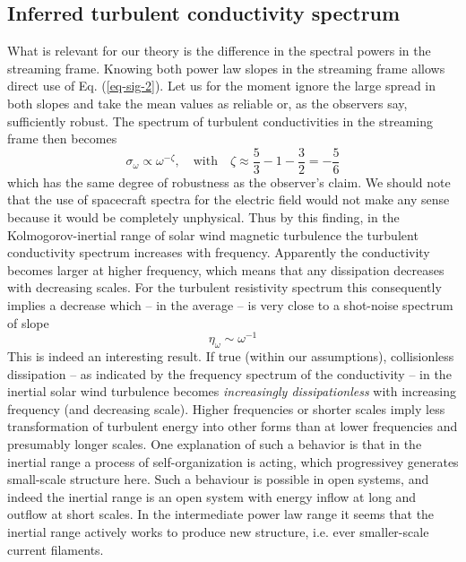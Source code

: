 \documentclass[ ]{copernicus2}
\begin{document}
{{{\subsection{Inferred turbulent conductivity spectrum}
{What is relevant for our theory is the difference in the spectral powers in the streaming frame. Knowing both power law slopes in the streaming frame allows direct use of Eq. (\ref{eq-sig-2}). Let us for the moment ignore the large spread in both slopes and take the mean values as reliable or, as the observers say, sufficiently robust. The spectrum of turbulent conductivities in the streaming frame then becomes 
\begin{equation}
\sigma_\omega\propto \omega^{-\zeta}, \quad \mathrm{with}\quad \zeta \approx\frac{5}{3}-1-\frac{3}{2}= -\frac{5}{6}
\end{equation}
which has the same degree of robustness as the observer's claim. We should note that the use of spacecraft spectra for the electric field would not make any sense because it would be completely unphysical. Thus by this finding, in the Kolmogorov-inertial range of solar wind magnetic turbulence the turbulent conductivity spectrum increases with frequency. Apparently the conductivity becomes larger at higher frequency, which means that any dissipation decreases with decreasing scales. For the turbulent resistivity spectrum this consequently implies a decrease which {-- in the average --} is very close to a shot-noise spectrum of slope 
\begin{equation}
\eta_\omega\sim \omega^{-1} 
\end{equation}
This is indeed an interesting result. If true (within our assumptions), collisionless dissipation -- as indicated by the frequency spectrum of the conductivity -- in the inertial solar wind turbulence becomes \emph{increasingly dissipationless} with increasing frequency (and {decreasing} scale). {Higher frequencies or shorter scales imply less transformation of turbulent energy into other forms than at lower frequencies and presumably longer scales. One explanation of such a behavior is that in the inertial range a process of self-organization is acting, which progressivey generates small-scale structure here. Such a behaviour is possible in open systems, and indeed the inertial range is an open system with energy inflow at long and outflow at short scales. In the intermediate power law range it seems that the inertial range actively works to produce new structure, i.e. ever smaller-scale current filaments.}} 

}}}
\end{document}
